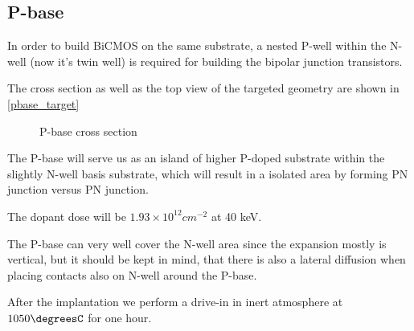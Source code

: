\subsection{P-base}\label{pbase_chapter}

In order to build BiCMOS on the same substrate, a nested P-well within the N-well (now it's twin well) is required for building the bipolar junction transistors.

The cross section as well as the top view of the targeted geometry are shown in \autoref{pbase_target}

\begin{figure}[H]
	\centering
	\begin{tikzpicture}[node distance = 3cm, auto, thick,scale=\CrossAndTopSectionBig, every node/.style={transform shape}]
		
	\end{tikzpicture}
	\caption{P-base cross section}
	\label{pbase_target}
\end{figure}

The P-base will serve us as an island of higher P-doped substrate within the slightly N-well basis substrate, which will result in a isolated area by forming PN junction versus PN junction.

The dopant dose will be $1.93\times10^{12}cm^{-2}$ at 40 keV.

The P-base can very well cover the N-well area since the expansion mostly is vertical, but it should be kept in mind, that there is also a lateral diffusion when placing contacts also on N-well around the P-base.

After the implantation we perform a drive-in in inert atmosphere at $1050\degreesC$ for one hour.
